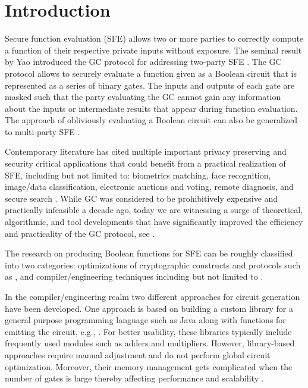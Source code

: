 \chapter{Introduction}
Secure function evaluation (SFE) allows two or more parties to correctly compute a function of their respective private inputs without exposure.
The seminal result by Yao introduced the GC protocol for addressing two-party SFE \cite{yao1986generate}.
The GC protocol allows to securely evaluate a function given as a Boolean circuit that is represented as a series of binary gates.
The inputs and outputs of each gate are masked such that the party evaluating the GC cannot gain any information about the inputs or  intermediate results that appear during function evaluation.
The approach of obliviously evaluating a Boolean circuit can also be generalized to multi-party SFE \cite{goldreich1987play,ben2008fairplaymp}.

Contemporary literature has cited multiple important privacy preserving and security critical applications that could benefit from a practical realization of SFE, including but not limited to: biometrics matching, face recognition, image/data classification, electronic auctions and voting, remote diagnosis, and secure search \cite{bringer2013privacy, evans2011efficient, barni2009secure, naor1999privacy, brickell2007privacy, jha2008towards}.
While GC was considered to be prohibitively expensive and practically infeasible a decade ago, today we are witnessing a surge of theoretical, algorithmic, and tool developments that have significantly improved the efficiency and practicality of the GC protocol, see \cite{malkhi2004fairplay, kolesnikov2008improved, pinkas2009secure, huang2011faster, bellare2013efficient}.

The research on producing Boolean functions for SFE can be roughly classified into two categories: optimizations of cryptographic constructs and protocols such as  \cite{kolesnikov2008improved,pinkas2009secure,bellare2012foundations,bellare2013efficient,kolesnikov2014flexor,zahur2015two}, and compiler/engineering techniques including but not limited to \cite{malkhi2004fairplay,kreuter2012billion,huang2011faster, malka2011vmcrypt,henecka2013faster,kreuter2013pcf,franz2014cbmc}.

In the compiler/engineering realm two different approaches for circuit generation have been developed.
One approach is based on building a custom library for a general purpose programming language such as Java along with functions for emitting the circuit, e.g., \cite{huang2011faster,malka2011vmcrypt,henecka2013faster}.
For better usability, these libraries typically include frequently used modules such as adders and multipliers.
However, library-based approaches require manual adjustment and do not perform global circuit optimization.
Moreover, their memory management gets complicated when the number of gates is large thereby affecting performance and scalability \cite{henecka2013faster}.

